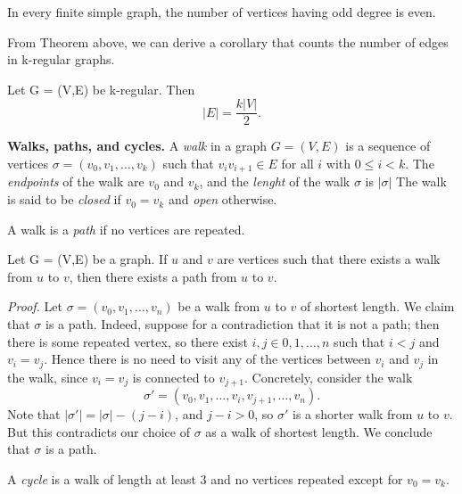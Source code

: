 \documentclass{tufte-handout}
\begin{document}
\begin{Corollary}
    In every finite simple graph, the number of vertices having odd degree is even.
\end{Corollary}

From Theorem above, we can derive a corollary that counts the number of edges in k-regular graphs.

\begin{Corollary}
    Let G = (V,E) be k-regular. Then \[\left|E\right| = \frac{k\left|V\right|}{2}.\]
\end{Corollary}

\textbf{Walks, paths, and cycles.} A \textit{walk} in a graph \( G = (V,E) \)
is a sequence of vertices \( \sigma = (v_0, v_1, \ldots, v_k) \) such that \( v_i v_{i+1} \in E \) for all \( i \) with \( 0 \leq i < k \). 
The \textit{endpoints} of the walk are \( v_0 \) and \( v_k \), and the \textit{lenght} of the walk \( \sigma \) is \( \left|\sigma\right| \)
The walk is said to be \textit{closed} if \( v_0 = v_k \) and \textit{open} otherwise. 

A walk is a \textit{path} if no vertices are repeated. 
\begin{Theorem}
    Let G = (V,E) be a graph. If \( u \) and \( v \) are 
    vertices such that there exists a walk from \( u \) to \( v \), then there exists a path from \( u \) to \( v \).
\end{Theorem}


\textit{Proof.} Let \( \sigma = (v_0, v_1, \ldots, v_n) \) be a walk from \( u \) to \( v \) of shortest length.
We claim that \( \sigma \) is a path. Indeed, suppose for a contradiction that it is not a path; then there is some repeated vertex,
so there exist \( i,j \in {0,1,\ldots,n}\) such that \(i < j \) and \( v_i = v_j \).  Hence
there is no need to visit any of the vertices between \( v_i \) and \( v_j \) in the walk,
since \( v_i = v_j\) is connected to \( v_{j+1} \). Concretely, consider the walk 
\[\sigma'=(v_0, v_1, \ldots, v_i, v_{j+1}, \ldots, v_n).\]
Note that \( \left|\sigma'\right| = \left|\sigma\right| - (j-i) \), and \( j-i>0 \), so \( \sigma' \) is a
shorter walk from \( u \) to \( v \). But this contradicts our choice of \( \sigma \) as a walk of shortest length.
We conclude that \( \sigma \) is a path.
\qedsymbol

A \textit{cycle} is a walk of length at least 3 and no vertices repeated except for \( v_0 = v_k \).
\end{document}

